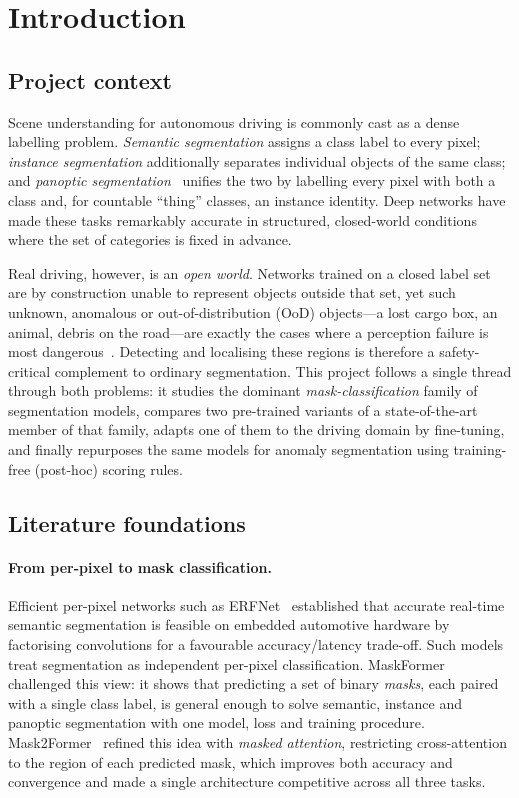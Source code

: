 \section{Introduction}
\label{sec:intro}

\subsection{Project context}
Scene understanding for autonomous driving is commonly cast as a dense
labelling problem. \emph{Semantic segmentation} assigns a class label to
every pixel; \emph{instance segmentation} additionally separates individual
objects of the same class; and \emph{panoptic segmentation}~\cite{kirillov}
unifies the two by labelling every pixel with both a class and, for
countable ``thing'' classes, an instance identity. Deep networks have made
these tasks remarkably accurate in structured, closed-world conditions where
the set of categories is fixed in advance.

Real driving, however, is an \emph{open world}. Networks trained on a closed
label set are by construction unable to represent objects outside that
set, yet such unknown, anomalous or out-of-distribution (OoD) objects---a
lost cargo box, an animal, debris on the road---are exactly the cases where
a perception failure is most dangerous~\cite{smiyc,fishyscapes}. Detecting
and localising these regions is therefore a safety-critical complement to
ordinary segmentation. This project follows a single thread through both
problems: it studies the dominant \emph{mask-classification} family of
segmentation models, compares two pre-trained variants of a state-of-the-art
member of that family, adapts one of them to the driving domain by
fine-tuning, and finally repurposes the same models for anomaly segmentation
using training-free (post-hoc) scoring rules.

\subsection{Literature foundations}
\paragraph{From per-pixel to mask classification.}
Efficient per-pixel networks such as ERFNet~\cite{erfnet} established that
accurate real-time semantic segmentation is feasible on embedded automotive
hardware by factorising convolutions for a favourable accuracy/latency
trade-off. Such models treat segmentation as independent per-pixel
classification. MaskFormer~\cite{maskformer} challenged this view: it shows
that predicting a set of binary \emph{masks}, each paired with a single class
label, is general enough to solve semantic, instance and panoptic
segmentation with one model, loss and training procedure.
Mask2Former~\cite{mask2former} refined this idea with \emph{masked
attention}, restricting cross-attention to the region of each predicted mask,
which improves both accuracy and convergence and made a single architecture
competitive across all three tasks.

